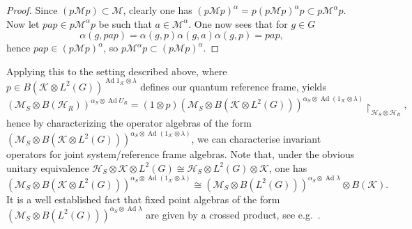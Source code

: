 \documentclass[sn-mathphys-num]{sn-jnl}%
\newcommand{\HH}{\mathcal{H}}
\newcommand{\KK}{\mathcal{K}}
\newcommand{\MM}{\mathcal{M}}
\DeclareMathOperator{\Ad}{Ad}
\numberwithin{equation}{section}
\theoremstyle{thmstyleone}%
\theoremstyle{thmstyletwo}%
\theoremstyle{thmstylethree}%
\begin{document}
    \begin{proof}
        Since $(p\MM p)\subset \MM$, clearly one has $(p\MM p)^{\alpha}=p(p\MM p)^{\alpha}p\subset p\MM^{\alpha}p$. Now let $pap\in p\MM^{\alpha}p$ be such that $a\in \MM^{\alpha}$. One now sees that for $g\in G$ \begin{equation*}
            \alpha(g,pap)=\alpha(g,p)\alpha(g,a)\alpha(g,p)=pap,
        \end{equation*}
        hence $pap\in (p\MM p)^{\alpha}$, so $p\MM^{\alpha}p\subset (p\MM p)^{\alpha}$. 
    \end{proof}
    Applying this to the setting described above, where $p\in B(\KK\otimes L^2(G))^{\Ad 1_\KK\otimes\lambda}$ defines our quantum reference frame, yields 
    \begin{equation}
        (\MM_S\otimes B(\HH_R))^{\alpha_S\otimes\Ad U_R}=(1\otimes p)(\MM_S\otimes B(\KK\otimes L^2(G)))^{\alpha_S\otimes\Ad (1_\KK\otimes \lambda)}\restriction_{\HH_S\otimes\HH_R},
    \end{equation}
    hence by characterizing the operator algebras of the form $(\MM_S\otimes B(\KK\otimes L^2(G)))^{\alpha_S\otimes\Ad (1_\KK\otimes \lambda)}$, we can characterise invariant operators for joint system/reference frame algebras. Note that, under the obvious unitary equivalence $\HH_S\otimes \KK\otimes L^2(G)\cong \HH_S\otimes L^2(G)\otimes \KK$, one has
    \begin{equation}
        (\MM_S\otimes B(\KK\otimes L^2(G)))^{\alpha_S\otimes\Ad (1_\KK\otimes \lambda)}\cong (\MM_S\otimes B(L^2(G)))^{\alpha_S\otimes\Ad \lambda}\otimes B(\KK).
    \end{equation} It is a well established fact that fixed point algebras of the form $(\MM_S\otimes B(L^2(G)))^{\alpha_S\otimes\Ad \lambda}$ are given by a crossed product, see e.g.\  \cite{vanDaele:1978}.
\end{document}
